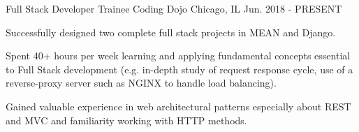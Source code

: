 

\begin{cventries}

  \cventry
    {Full Stack Developer Trainee} %
    {Coding Dojo} %
    {Chicago, IL} %
    {Jun. 2018 - PRESENT} %
    {
      \begin{cvitems} %
        \item {Successfully designed two complete full stack projects in MEAN and Django.}
        \item {Spent 40+ hours per week learning and applying fundamental concepts essential to Full Stack development (e.g. in-depth study of request response cycle, use of a reverse-proxy server such as NGINX to handle load balancing).}
        \item {Gained valuable experience in web architectural patterns especially about REST and MVC and familiarity working with HTTP methods.}
      \end{cvitems}
    }

\end{cventries}
